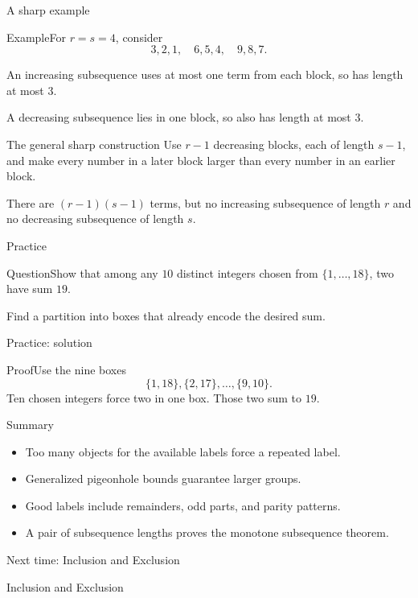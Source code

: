 \documentclass[aspectratio=169,11pt]{beamer}
\renewcommand{\Proof}[1]{\begin{block}{Proof}\normalsize #1\end{block}}
\newcommand{\Question}[1]{\begin{block}{Question}#1\end{block}}
\renewcommand{\Example}[1]{\begin{block}{Example}#1\end{block}}
\newcommand{\gap}{\par\medskip}
\begin{document}
\begin{frame}{A sharp example}
\large
\Example{For $r=s=4$, consider
\[3,2,1,\quad6,5,4,\quad9,8,7.\]}
\gap An increasing subsequence uses at most one term from each block, so has length at most $3$.
\gap A decreasing subsequence lies in one block, so also has length at most $3$.
\end{frame}
\begin{frame}{The general sharp construction}
\large
Use $r-1$ decreasing blocks, each of length $s-1$, and make every number in a later block larger than every number in an earlier block.
\gap There are $(r-1)(s-1)$ terms, but no increasing subsequence of length $r$ and no decreasing subsequence of length $s$.
\end{frame}
\begin{frame}{Practice}
\large
\Question{Show that among any $10$ distinct integers chosen from $\{1,\ldots,18\}$, two have sum $19$.}
\gap Find a partition into boxes that already encode the desired sum.
\end{frame}
\begin{frame}{Practice: solution}
\large
\Proof{Use the nine boxes
\[\{1,18\},\{2,17\},\ldots,\{9,10\}.\]
Ten chosen integers force two in one box. Those two sum to $19$.}
\end{frame}
\begin{frame}{Summary}
\large
\begin{itemize}
\item Too many objects for the available labels force a repeated label.
\item Generalized pigeonhole bounds guarantee larger groups.
\item Good labels include remainders, odd parts, and parity patterns.
\item A pair of subsequence lengths proves the monotone subsequence theorem.
\end{itemize}
\end{frame}
\begin{frame}{Next time: Inclusion and Exclusion}\begin{center}{\Huge Inclusion and Exclusion}\end{center}\end{frame}
\end{document}
